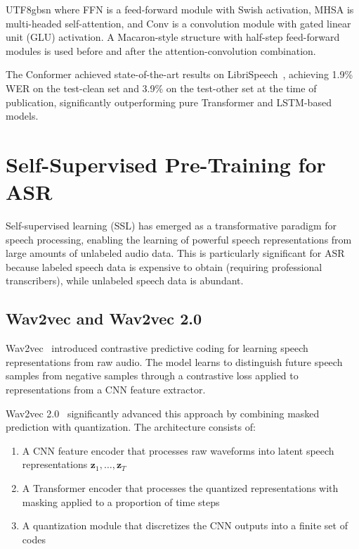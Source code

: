 \documentclass[12pt,a4paper]{article}
\begin{document}
\begin{CJK}{UTF8}{gbsn}
where FFN is a feed-forward module with Swish activation, MHSA is multi-headed self-attention, and Conv is a convolution module with gated linear unit (GLU) activation. A Macaron-style structure with half-step feed-forward modules is used before and after the attention-convolution combination.

The Conformer achieved state-of-the-art results on LibriSpeech~\cite{panayotov2015librispeech}, achieving 1.9\% WER on the test-clean set and 3.9\% on the test-other set at the time of publication, significantly outperforming pure Transformer and LSTM-based models.

\section{Self-Supervised Pre-Training for ASR}
\label{sec:pretraining}

Self-supervised learning (SSL) has emerged as a transformative paradigm for speech processing, enabling the learning of powerful speech representations from large amounts of unlabeled audio data. This is particularly significant for ASR because labeled speech data is expensive to obtain (requiring professional transcribers), while unlabeled speech data is abundant.

\subsection{Wav2vec and Wav2vec 2.0}
\label{subsec:wav2vec}

Wav2vec~\cite{schneider2019wav2vec} introduced contrastive predictive coding for learning speech representations from raw audio. The model learns to distinguish future speech samples from negative samples through a contrastive loss applied to representations from a CNN feature extractor.

Wav2vec 2.0~\cite{baevski2020wav2vec} significantly advanced this approach by combining masked prediction with quantization. The architecture consists of:
\begin{enumerate}[leftmargin=*]
    \item A CNN feature encoder that processes raw waveforms into latent speech representations $\mathbf{z}_1, \ldots, \mathbf{z}_T$
    \item A Transformer encoder that processes the quantized representations with masking applied to a proportion of time steps
    \item A quantization module that discretizes the CNN outputs into a finite set of codes
\end{enumerate}


\end{CJK}
\end{document}

